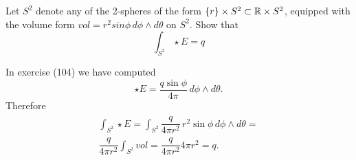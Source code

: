 \begin{p}%
	
	Let $S^2$ denote any of the 2-spheres of the form $\{r\}\times S^2\subset \mathbb{R}\times S^2$, equipped with the volume form $vol = r^2 sin\phi\, d\phi\wedge d\theta$ on $S^2$. Show that
	$$
	\int_{S^2}\star E =q
	$$
\end{p}
In exercise (104) we have computed 
$$\star E = \dfrac{q\sin\phi}{4\pi}\,d\phi\wedge d\theta.$$
Therefore 
\begin{eqnarray}
\begin{aligned}
\int_{S^2}\star E = \int_{S^2}\dfrac{q}{4\pi r^2}\,r^2 \sin\phi\,d\phi\wedge d\theta =\\
\dfrac{q}{4\pi r^2}\int_{S^2}vol = \dfrac{q}{4\pi r^2}4\pi r^2 = q.
\end{aligned}
\end{eqnarray}

\begin{p}
\end{p}


\begin{p}
\end{p}


\begin{p}
\end{p}


\begin{p}
\end{p}


\begin{p}%
\end{p}

